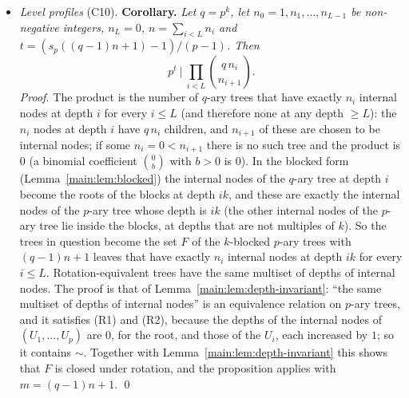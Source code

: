 \documentclass[11pt]{article}
\theoremstyle{definition}
\theoremstyle{remark}
\numberwithin{equation}{section}
\numberwithin{figure}{section}
\begin{document}
\begin{itemize}[itemsep=1pt]
 For $q=p^k$ with $k\ge2$ this is a statement about the blocked form (Lemma~\ref{main:lem:blocked}): a set of
 $q$-ary trees is called closed under rotation if the set of the corresponding $k$-blocked $p$-ary trees is
 closed under rotation; rotations map $k$-blocked trees to $k$-blocked trees
 (Lemma~\ref{main:lem:depth-invariant}). In terms of the $q$-ary tree, the $q$ children of a node are then
 permuted by the group that the rotations at the $k$ levels of its block generate: the group of the remark
 after the definition of $\sim$ in Section~\ref{sec:mainproof}, of order $p^{(q-1)/(p-1)}$ (one rotation for
 each of the $(q-1)/(p-1)$ nodes of the block). For $k\ge2$ this is not the group of cyclic shifts of the $q$
 children: for $q=4$ it is generated by the permutations $(1\,2)$, $(3\,4)$ and $(1\,3)(2\,4)$ of the four
 children, has $8$ elements, and does not contain the shift $(1\,2\,3\,4)$ (compare the items on mobiles and
 on quadtrees in Section~\ref{sec:connections}). A statistic that is invariant only under cyclic shifts of the
 $q$ children is not covered by the proposition.
\item \emph{Level profiles} (C10). \textbf{Corollary.} \emph{Let $q=p^k$, let $n_0=1,n_1,\dots,n_{L-1}$ be
 non-negative integers, $n_L=0$, $n=\sum_{i<L}n_i$ and $t=(s_p((q-1)n+1)-1)/(p-1)$. Then}
 \[
  p^t\ \Big|\ \prod_{i<L}\binom{q\,n_i}{n_{i+1}} .
 \]
 \emph{Proof.} The product is the number of $q$-ary trees that have exactly $n_i$ internal nodes at depth $i$
 for every $i\le L$ (and therefore none at any depth $\ge L$): the $n_i$ nodes at depth $i$ have $q\,n_i$
 children, and $n_{i+1}$ of these are chosen to be internal nodes; if some $n_i=0<n_{i+1}$ there is no such
 tree and the product is $0$ (a binomial coefficient $\binom{0}{b}$ with $b>0$ is $0$). In the blocked form
 (Lemma~\ref{main:lem:blocked}) the internal nodes of the
 $q$-ary tree at depth $i$ become the roots of the blocks at depth $ik$, and these are exactly the internal
 nodes of the $p$-ary tree whose depth is $ik$ (the other internal nodes of the $p$-ary tree lie inside the
 blocks, at depths that are not multiples of $k$). So the trees in question become the set $F$ of the $k$-blocked $p$-ary
 trees with $(q-1)n+1$ leaves that have exactly $n_i$ internal nodes at depth $ik$ for every $i\le L$.
 Rotation-equivalent trees have the same multiset of depths of internal nodes. The proof is that of
 Lemma~\ref{main:lem:depth-invariant}: ``the same multiset of depths of internal nodes'' is an equivalence
 relation on $p$-ary trees, and it satisfies (R1) and (R2), because the depths of the internal nodes of
 $(U_1,\dots,U_p)$ are $0$, for the root, and those of the $U_i$, each increased by $1$; so it contains
 $\sim$. Together with Lemma~\ref{main:lem:depth-invariant} this shows that $F$ is closed under rotation, and
 the proposition applies with $m=(q-1)n+1$. \qed


\end{itemize}
\end{document}
